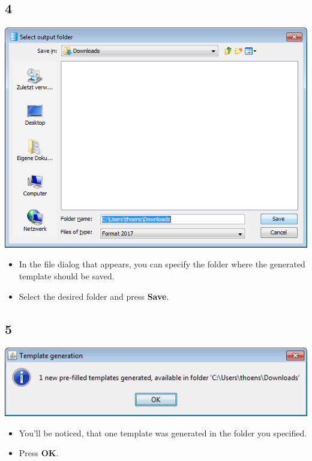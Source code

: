 \documentclass{beamer}
\begin{document}
\subsection{4}
\begin{frame}
	\begin{center}
  		\includegraphics[height=0.6\textheight]{4.png}
	\end{center}
	\begin{itemize}
		\item In the file dialog that appears, you can specify the folder where the generated template should be saved.
		\item Select the desired folder and press \textbf{Save}.
	\end{itemize}
\end{frame}

\subsection{5}
\begin{frame}
	\begin{center}
  		\includegraphics[height=0.2\textheight]{5.png}
	\end{center}
	\begin{itemize}
		\item You'll be noticed, that one template was generated in the folder you specified.
		\item Press \textbf{OK}.
	\end{itemize}
\end{frame}
\end{document}
